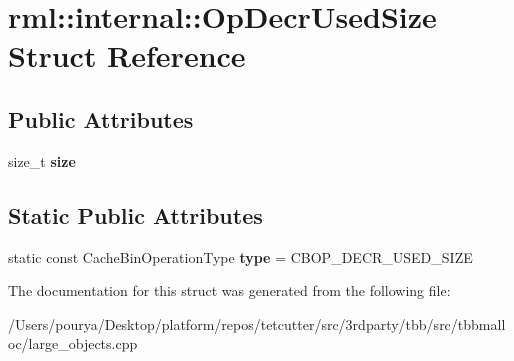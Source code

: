 \hypertarget{structrml_1_1internal_1_1OpDecrUsedSize}{}\section{rml\+:\+:internal\+:\+:Op\+Decr\+Used\+Size Struct Reference}
\label{structrml_1_1internal_1_1OpDecrUsedSize}
\subsection*{Public Attributes}
\begin{DoxyCompactItemize}
\item 
\hypertarget{structrml_1_1internal_1_1OpDecrUsedSize_a6ef8db54112c2ac5e88084ee72877985}{}size\+\_\+t {\bfseries size}\label{structrml_1_1internal_1_1OpDecrUsedSize_a6ef8db54112c2ac5e88084ee72877985}

\end{DoxyCompactItemize}
\subsection*{Static Public Attributes}
\begin{DoxyCompactItemize}
\item 
\hypertarget{structrml_1_1internal_1_1OpDecrUsedSize_acc7cad796e7a1f5488e803d3b0d552d6}{}static const Cache\+Bin\+Operation\+Type {\bfseries type} = C\+B\+O\+P\+\_\+\+D\+E\+C\+R\+\_\+\+U\+S\+E\+D\+\_\+\+S\+I\+Z\+E\label{structrml_1_1internal_1_1OpDecrUsedSize_acc7cad796e7a1f5488e803d3b0d552d6}

\end{DoxyCompactItemize}


The documentation for this struct was generated from the following file\+:\begin{DoxyCompactItemize}
\item 
/\+Users/pourya/\+Desktop/platform/repos/tetcutter/src/3rdparty/tbb/src/tbbmalloc/large\+\_\+objects.\+cpp\end{DoxyCompactItemize}
